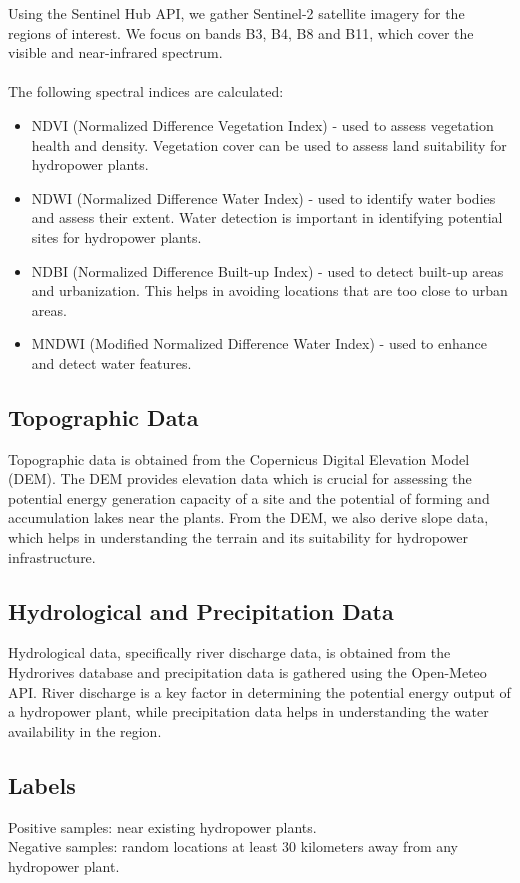 \documentclass[12pt,a4paper]{article}
\begin{document}
Using the Sentinel Hub API, we gather Sentinel-2 satellite imagery for the
regions of interest. We focus on bands B3, B4, B8 and B11, which cover the
visible and near-infrared spectrum.
\\
\\
The following spectral indices are calculated:
\begin{itemize}
  \item NDVI (Normalized Difference Vegetation Index) - used to assess
  vegetation health and density. Vegetation cover can be used to assess land
  suitability for hydropower plants.
  \item NDWI (Normalized Difference Water Index) - used to identify water
  bodies and assess their extent. Water detection is important in identifying
  potential sites for hydropower plants.
  \item NDBI (Normalized Difference Built-up Index) - used to detect built-up
  areas and urbanization. This helps in avoiding locations that are too close
  to urban areas.
  \item MNDWI (Modified Normalized Difference Water Index) - used to enhance
  and detect water features.
\end{itemize}

\subsection{Topographic Data}

Topographic data is obtained from the Copernicus Digital Elevation Model (DEM).
The DEM provides elevation data which is crucial for assessing the potential
energy generation capacity of a site and the potential of forming and
accumulation lakes near the plants. From the DEM, we also derive slope data,
which helps in understanding the terrain and its suitability for hydropower
infrastructure.

\subsection{Hydrological and Precipitation Data}

Hydrological data, specifically river discharge data, is obtained from the
Hydrorives database and precipitation data is gathered using the Open-Meteo
API. River discharge is a key factor in determining the potential energy
output of a hydropower plant, while precipitation data helps in understanding
the water availability in the region.

\subsection{Labels}
Positive samples: near existing hydropower plants. \\
Negative samples: random locations at least 30 kilometers away from any
hydropower plant.
\end{document}
